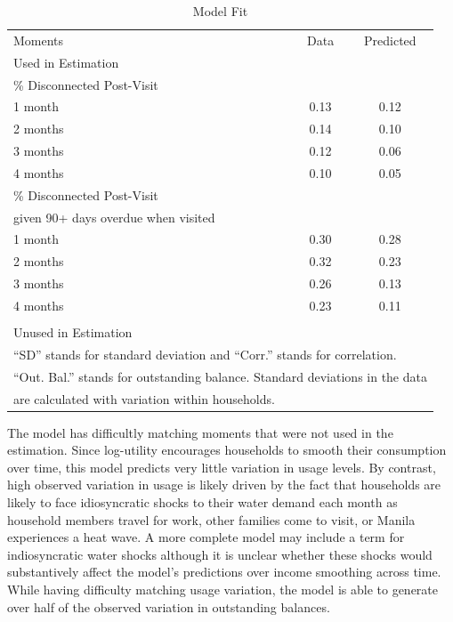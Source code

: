 \documentclass[12pt]{article}
\begin{document}
\begin{table}[H]
\centering
\caption{Model Fit}\label{table:fit}

\begin{tabular}{l*{1}{cc}}
\toprule
 Moments & Data  & Predicted \\[.5em]
Used in Estimation & & \\
\midrule
[.5em]
\% Disconnected Post-Visit  & & \\[.2em]
1 month &0.13&0.12\\
2 months &0.14&0.10\\
3 months  &0.12&0.06\\
4 months &0.10&0.05\\[.8em]
\% Disconnected Post-Visit & & \\
given 90+ days overdue when visited & & \\[.2em]
1 month &0.30&0.28\\
2 months &0.32&0.23\\
3 months &0.26&0.13\\
4 months &0.23&0.11\\
& & \\
Unused in Estimation & & \\
\midrule

\bottomrule
\multicolumn{3}{l}{\scriptsize ``SD'' stands for standard deviation and ``Corr.'' stands for correlation. }  \\[-.5em]
\multicolumn{3}{l}{\scriptsize ``Out. Bal.'' stands for outstanding balance. Standard deviations in the data }  \\[-.5em]
\multicolumn{3}{l}{\scriptsize are calculated with variation within households.}
\end{tabular}
%
\end{table}

The model has difficultly matching moments that were not used in the estimation.  Since log-utility encourages households to smooth their consumption over time, this model predicts very little variation in usage levels.  By contrast, high observed variation in usage is likely driven by the fact that households are likely to face idiosyncratic shocks to their water demand each month as household members travel for work, other families come to visit, or Manila experiences a heat wave.  A more complete model may include a term for indiosyncratic water shocks although it is unclear whether these shocks would substantively affect the model's predictions over income smoothing across time.  While having difficulty matching usage variation, the model is able to generate over half of the observed variation in outstanding balances.  
\end{document}

